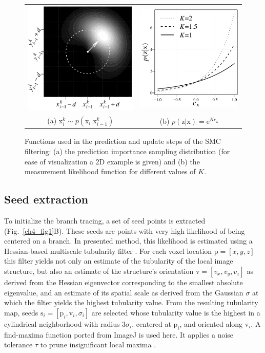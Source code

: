 \begin{figure}
	\centering
	\begin{tabular}{cc}
		\includegraphics[width=0.35\columnwidth]{fig2a} &
		\includegraphics[width=0.35\columnwidth]{fig2b} \\ %
		(a) $\mathrm{x}_{i}^k \sim p(\mathrm{x}_i | \mathrm{x}_{i-1}^k)$ & \hspace{2em} 
		(b) $p(\mathrm{z} | \mathrm{x})=\textrm{e}^{Kc_{\mathrm{x}}}$ \\
	\end{tabular}
	\caption{Functions used in the prediction and update steps of the SMC filtering: (a) the prediction importance sampling distribution (for ease of visualization a 2D example is given) and (b) the measurement likelihood function for different values of $K$.}
	\label{ch4_fig2}
\end{figure}

\subsection{Seed extraction}
\label{subsec:seed-extraction}
To initialize the branch tracing, a set of seed points is extracted (Fig.~\ref{ch4_fig1}B). These seeds are points with very high likelihood of being centered on a branch. In presented method, this likelihood is estimated using a Hessian-based multiscale tubularity filter \cite{frangi1998multiscale}. For each voxel location $\mathrm{p} = [x,y,z]$ this filter yields not only an estimate of the tubularity of the local image structure, but also an estimate of the structure's orientation $\mathrm{v} = [ v_x, v_y, v_z ]$ as derived from the Hessian eigenvector corresponding to the smallest absolute eigenvalue, and an estimate of its spatial scale as derived from the Gaussian $\sigma$ at which the filter yields the highest tubularity value. From the resulting tubularity map, seeds $\mathrm{s}_i = [ \mathrm{p}_i, \mathrm{v}_i, \sigma_i ]$ are selected whose tubularity value is the highest in a cylindrical neighborhood with radius $3\sigma_i$, centered at $\mathrm{p}_i$, and oriented along $\mathrm{v}_i$. A find-maxima function ported from ImageJ is used here. It applies a noise tolerance $\tau$ to prune insignificant local maxima \cite{ferreira2012imagej}.

